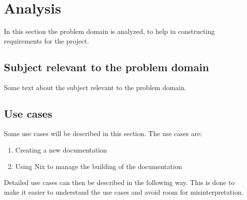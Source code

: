 \section{Analysis}
In this section the problem domain is analyzed, to help in constructing requirements for the project. 

\subsection{Subject relevant to the problem domain}
Some text about the subject relevant to the problem domain.

\subsection{Use cases}
Some use cases will be described in this section. The use cases are:
\begin{enumerate}
    \item Creating a new documentation
    \item Using Nix to manage the building of the documentation
\end{enumerate}

Detailed use cases can then be described in the following way.
This is done to make it easier to understand the use cases and avoid room for misinterpretation.


